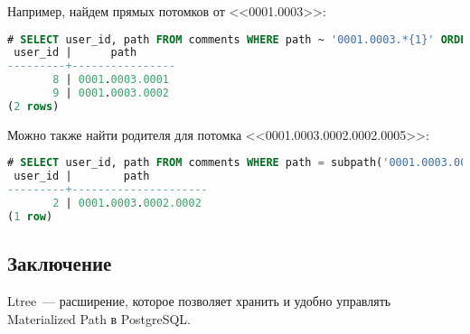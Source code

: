 Например, найдем прямых потомков от <<0001.0003>>:

\begin{lstlisting}[language=SQL,label=lst:pgltree9,caption=Ltree]
# SELECT user_id, path FROM comments WHERE path ~ '0001.0003.*{1}' ORDER by path;
 user_id |      path
---------+----------------
       8 | 0001.0003.0001
       9 | 0001.0003.0002
(2 rows)
\end{lstlisting}

Можно также найти родителя для потомка <<0001.0003.0002.0002.0005>>:

\begin{lstlisting}[language=SQL,label=lst:pgltree10,caption=Ltree]
# SELECT user_id, path FROM comments WHERE path = subpath('0001.0003.0002.0002.0005', 0, -1) ORDER by path;
 user_id |        path
---------+---------------------
       2 | 0001.0003.0002.0002
(1 row)
\end{lstlisting}


\subsection{Заключение}

Ltree~--- расширение, которое позволяет хранить и удобно управлять Materialized Path в PostgreSQL.